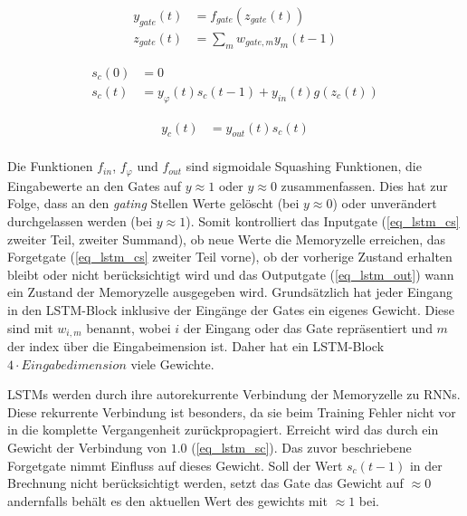 \begin{equation}
\label{eq_lstm_gate}
\begin{split}
y_{gate}(t) &= f_{gate}(z_{gate}(t))\\
z_{gate}(t) &= \sum \limits_{m} w_{gate,m}y_m(t-1)
\end{split}
\end{equation}

\begin{equation}
\label{eq_lstm_cs}
\begin{split}
s_{c}(0) &= 0\\
s_{c}(t) &= y_{\varphi}(t)s_{c}(t-1) +
y_{in}(t)g(z_{c}(t))
\end{split}
\end{equation}

\begin{equation}
\label{eq_lstm_out}
\begin{split}
y_{c}(t) &= y_{out}(t)s_{c}(t)\\
\end{split}
\end{equation}

Die Funktionen $f_{in}$, $f_{\varphi}$ und $f_{out}$ sind sigmoidale Squashing
Funktionen, die Eingabewerte an den Gates auf $y\approx1$ oder $y\approx0$
zusammenfassen. Dies hat zur Folge, dass an den \textit{gating} Stellen Werte
gelöscht (bei $y\approx0$) oder unverändert durchgelassen werden (bei
$y\approx1$). Somit kontrolliert das Inputgate (\autoref{eq_lstm_cs} zweiter
Teil, zweiter Summand), ob neue Werte die Memoryzelle erreichen, das Forgetgate
(\autoref{eq_lstm_cs} zweiter Teil vorne), ob der vorherige Zustand erhalten
bleibt oder nicht berücksichtigt wird und das Outputgate (\autoref{eq_lstm_out})
wann ein Zustand der Memoryzelle ausgegeben wird. Grundsätzlich hat jeder
Eingang in den \ac{LSTM}-Block inklusive der Eingänge der Gates ein eigenes
Gewicht. Diese sind mit $w_{i,m}$ benannt, wobei $i$ der Eingang oder das Gate
repräsentiert und $m$ der index über die Eingabeimension ist. Daher hat ein
\ac{LSTM}-Block $4\cdot Eingabedimension$ viele Gewichte. 

\acp{LSTM} werden durch ihre autorekurrente Verbindung der Memoryzelle zu
\acp{RNN}. Diese rekurrente Verbindung ist besonders, da sie beim Training
Fehler nicht vor in die komplette Vergangenheit zurückpropagiert. Erreicht wird
das durch ein Gewicht der Verbindung von $1.0$ (\autoref{eq_lstm_sc}). Das zuvor
beschriebene Forgetgate nimmt Einfluss auf dieses Gewicht. Soll der Wert
$s_c(t-1)$ in der Brechnung nicht berücksichtigt werden, setzt das Gate das
Gewicht auf $\approx0$ andernfalls behält es den aktuellen Wert des gewichts mit
$\approx1$ bei. 

